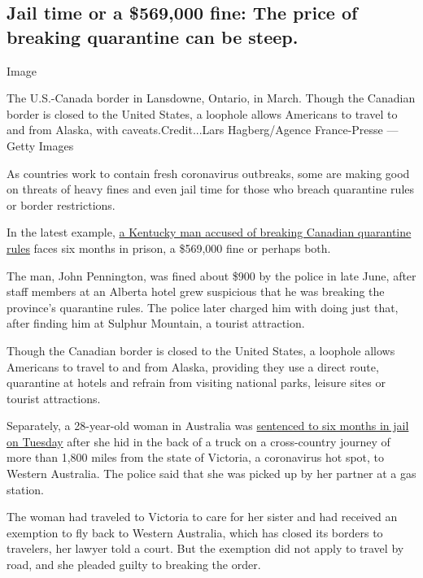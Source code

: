 \hypertarget{jail-time-or-a-569000-fine-the-price-of-breaking-quarantine-can-be-steep}{%
\subsection{Jail time or a \$569,000 fine: The price of breaking
quarantine can be
steep.}\label{jail-time-or-a-569000-fine-the-price-of-breaking-quarantine-can-be-steep}}

Image

The U.S.-Canada border in Lansdowne, Ontario, in March. Though the
Canadian border is closed to the United States, a loophole allows
Americans to travel to and from Alaska, with caveats.Credit...Lars
Hagberg/Agence France-Presse --- Getty Images

As countries work to contain fresh coronavirus outbreaks, some are
making good on threats of heavy fines and even jail time for those who
breach quarantine rules or border restrictions.

In the latest example,
\href{https://www.npr.org/2020/08/25/905847150/american-man-accused-of-breaking-canadas-covid-19-rules-faces-560-000-fine}{a
Kentucky man accused of breaking Canadian quarantine rules} faces six
months in prison, a \$569,000 fine or perhaps both.

The man, John Pennington, was fined about \$900 by the police in late
June, after staff members at an Alberta hotel grew suspicious that he
was breaking the province's quarantine rules. The police later charged
him with doing just that, after finding him at Sulphur Mountain, a
tourist attraction.

Though the Canadian border is closed to the United States, a loophole
allows Americans to travel to and from Alaska, providing they use a
direct route, quarantine at hotels and refrain from visiting national
parks, leisure sites or tourist attractions.

Separately, a 28-year-old woman in Australia was
\href{https://www.abc.net.au/news/2020-08-25/woman-who-snuck-into-wa-on-truck-handed-six-month-jail-sentence/12592832}{sentenced
to six months in jail on Tuesday} after she hid in the back of a truck
on a cross-country journey of more than 1,800 miles from the state of
Victoria, a coronavirus hot spot, to Western Australia. The police said
that she was picked up by her partner at a gas station.

The woman had traveled to Victoria to care for her sister and had
received an exemption to fly back to Western Australia, which has closed
its borders to travelers, her lawyer told a court. But the exemption did
not apply to travel by road, and she pleaded guilty to breaking the
order.


